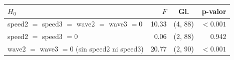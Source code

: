
\begin{tabular}{lrcr}
\toprule
$H_0$ & $F$ & Gl. & p-valor\\
\midrule
speed2 $=$ speed3 $=$ wave2 $=$ wave3 $=0$ & 10.33 & (4, 88) & $<0.001$\\
speed2 $=$ speed3 $=0$ & 0.06 & (2, 88) & 0.942\\
wave2 $=$ wave3 $=0$ (sin speed2 ni speed3) & 20.77 & (2, 90) & $<0.001$\\
\bottomrule
\end{tabular}
